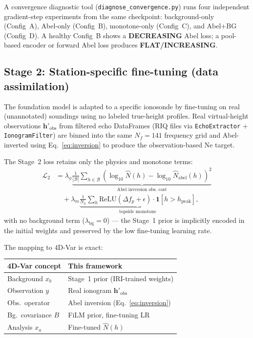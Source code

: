 \documentclass[11pt,twocolumn]{article}
\begin{document}
A convergence diagnostic tool (\texttt{diagnose\_convergence.py}) runs four
independent gradient-step experiments from the same checkpoint: background-only
(Config~A), Abel-only (Config~B), monotone-only (Config~C), and Abel$+$BG
(Config~D).
A healthy Config~B shows a \textbf{DECREASING} Abel loss; a pool-based encoder
or forward Abel loss produces \textbf{FLAT/INCREASING}.

\subsection{Stage 2: Station-specific fine-tuning (data assimilation)}

The foundation model is adapted to a specific ionosonde by fine-tuning on real
(unannotated) soundings using no labeled true-height profiles.
Real virtual-height observations $\mathbf{h}'_\text{obs}$ from filtered echo
DataFrames (RIQ files via \texttt{EchoExtractor} + \texttt{IonogramFilter}) are
binned into the same $N_f = 141$ frequency grid and Abel-inverted using
Eq.~\eqref{eq:inversion} to produce the observation-based Ne target.

The Stage~2 loss retains only the physics and monotone terms:
\begin{align}
  \mathcal{L}_2 &=
  \lambda_\phi\underbrace{
      \frac{1}{|\mathcal{B}|}\sum_{h\in\mathcal{B}}
      \!\left(\log_{10}\hat{N}(h) - \log_{10}\hat{N}_\text{abel}(h)\right)^2
    }_{\text{Abel inversion obs.\ cost}} \nonumber\\
  &\quad+ \lambda_m\underbrace{
      \frac{1}{N_h}\sum_h \text{ReLU}\!\left(\Delta f_p + \epsilon\right)
      \cdot \mathbf{1}[h > h_\text{peak}]
    }_{\text{topside monotone}},
  \label{eq:loss2}
\end{align}
with no background term ($\lambda_\text{bg}=0$) — the Stage~1 prior is
implicitly encoded in the initial weights and preserved by the low fine-tuning
learning rate.

The mapping to 4D-Var is exact:
\begin{center}
\scriptsize
\begin{tabular}{p{2.2cm}p{3.0cm}}
  \toprule
  4D-Var concept & This framework \\
  \midrule
  Background $x_b$ & Stage~1 prior (IRI-trained weights) \\
  Observation $y$ & Real ionogram $\mathbf{h}'_\text{obs}$ \\
  Obs.\ operator & Abel inversion (Eq.~\ref{eq:inversion}) \\
  Bg.\ covariance $B$ & FiLM prior, fine-tuning LR \\
  Analysis $x_a$ & Fine-tuned $\hat{N}(h)$ \\
  \bottomrule
\end{tabular}
\end{center}
\end{document}
